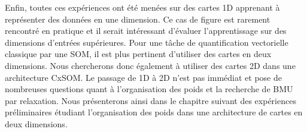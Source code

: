 \documentclass[../main]{subfiles}
\begin{document}
Enfin, toutes ces expériences ont été menées sur des cartes 1D apprenant à représenter des données en une dimension. Ce cas de figure est rarement rencontré en pratique et il serait intéressant d'évaluer l'apprentissage sur des dimensions d'entrées supérieures. Pour une tâche de quantification vectorielle classique par une SOM, il est plus pertinent d'utiliser des cartes en deux dimensions. Nous chercherons donc également à utiliser des cartes 2D dans une architecture CxSOM. Le passage de 1D à 2D n'est pas immédiat et pose de nombreuses questions quant à l'organisation des poids et la recherche de BMU par relaxation. 
Nous présenterons ainsi dans le chapitre suivant des expériences préliminaires étudiant l'organisation des poids dans une architecture de cartes en deux dimensions.

\ifSubfilesClassLoaded{
    \printbibliography
}{}
\end{document}
